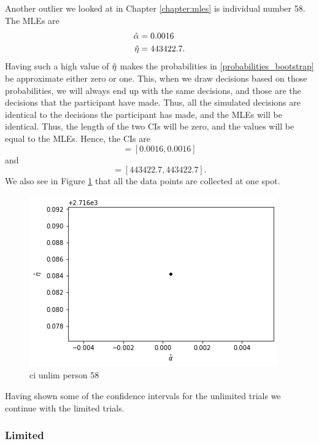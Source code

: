 Another outlier we looked at in Chapter \ref{chapter:mles} is individual number 58. The MLEs are 
\begin{equation*}
    \begin{aligned}
        \hat{\alpha} &= 0.0016\\
        \hat{\eta} &= 443422.7.
    \end{aligned}
\end{equation*}
Having such a high value of $\hat{\eta}$ makes the probabilities in \eqref{probabilities_bootstrap} be approximate either zero or one. This, when we draw decisions based on those probabilities, we will always end up with the same decisions, and those are the decisions that the participant have made. Thus, all the simulated decisions are identical to the decisions the participant has made, and the MLEs will be identical. Thus, the length of the two CIs will be zero, and the values will be equal to the MLEs. Hence, the CIs are
\begin{equation*}
    [\hat{\alpha}^{*(5)}_{1000},\hat{\alpha}^{*(95)}_{1000}] = [0.0016,0.0016]
\end{equation*}
and
\begin{equation*}
    [\hat{\eta}^{*(5)}_{1000},\hat{\eta}^{*(95)}_{1000}] = [443422.7,443422.7].
\end{equation*}
We also see in Figure \ref{fig:ci_unlim_person_58} that all the data points are collected at one spot. 
\begin{figure}
    \centering
    \includegraphics[scale=0.7]{pictures/ci_unlim_person58.png}
    \caption{ci unlim person 58}
    \label{fig:ci_unlim_person_58}
\end{figure}

Having shown some of the confidence intervals for the unlimited trials we continue with the limited trials.

\subsubsection{Limited}







